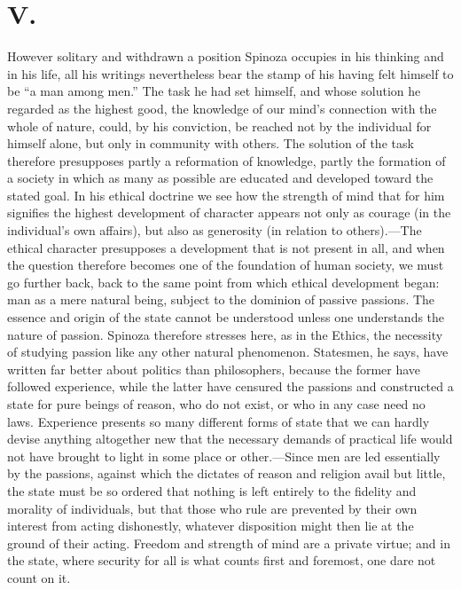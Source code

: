\documentclass[12pt]{book}
\newcommand{\opage}[1]{\marginnote{\footnotesize\textit{[#1]}}}
\begin{document}
\section*{V.}
\opage{147}However solitary and withdrawn a position Spinoza occupies in his thinking and in
his life, all his writings nevertheless bear the stamp of his having felt himself to be
``a man among men.'' The task he had set himself, and whose solution he regarded as the
highest good, the knowledge of our mind's connection with the whole of nature, could, by
his conviction, be reached not by the individual for himself alone, but only in community
with others. The solution of the task therefore presupposes partly a reformation of
knowledge, partly the formation of a society in which as many as possible are educated
and developed toward the stated goal. In his ethical doctrine we see how the strength of
mind that for him signifies the highest development of character appears not only as
courage (in the individual's own affairs), but also as generosity (in relation to
others).---The ethical character presupposes a development that is not present in all,
and when the question therefore becomes one of the foundation of human society, we must go
further back, back to the same point from which ethical development began: man as a mere
natural being, subject to the dominion of passive passions. The essence and origin of the
state cannot be understood unless one understands the nature of passion. Spinoza therefore
stresses here, \opage{148}as in the Ethics, the necessity of studying passion like any
other natural phenomenon. Statesmen, he says, have written far better about politics than
philosophers, because the former have followed experience, while the latter have
censured the passions and constructed a state for pure beings of reason, who do not
exist, or who in any case need no laws. Experience presents so many different forms of
state that we can hardly devise anything altogether new that the necessary demands of
practical life would not have brought to light in some place or other.---Since men are
led essentially by the passions, against which the dictates of reason and religion avail
but little, the state must be so ordered that nothing is left entirely to the fidelity
and morality of individuals, but that those who rule are prevented by their own interest
from acting dishonestly, whatever disposition might then lie at the ground of their
acting. Freedom and strength of mind are a private virtue; and in the state, where
security for all is what counts first and foremost, one dare not count on it.
\end{document}
